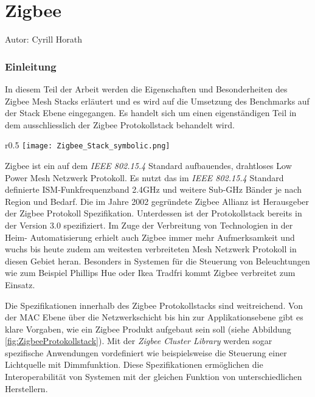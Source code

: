 \vspace*{4cm}
\part{Zigbee}\label{part:Zigbee}
Autor: Cyrill Horath
\vspace*{\fill}
\clearpage

\section{Einleitung}\label{sec:EinleitungZigbee}
In diesem Teil der Arbeit werden die Eigenschaften und Besonderheiten des Zigbee Mesh Stacks erläutert und es wird auf die Umsetzung des Benchmarks auf der Stack Ebene eingegangen. Es handelt sich um einen eigenständigen Teil in dem ausschliesslich der Zigbee Protokollstack behandelt wird.

\begin{wrapfigure}{r}{0.5\textwidth}
	\centering
	\texttt{[image: Zigbee\_Stack\_symbolic.png]}
	\caption{Zigbee Protokollstack}	\label{fig:ZigbeeProtokollstack}
\end{wrapfigure}

Zigbee ist ein auf dem \textit{IEEE 802.15.4} Standard aufbauendes, drahtloses Low Power Mesh Netzwerk Protokoll.
Es nutzt das im \textit{IEEE 802.15.4} Standard definierte ISM-Funkfrequenzband 2.4GHz und weitere Sub-GHz Bänder je nach Region und Bedarf.
Die im Jahre 2002 gegründete Zigbee Allianz ist Herausgeber der Zigbee Protokoll Spezifikation.
Unterdessen ist der Protokollstack bereits in der Version 3.0 spezifiziert.
Im Zuge der Verbreitung von Technologien in der Heim- Automatisierung erhielt auch Zigbee immer mehr Aufmerksamkeit und wuchs bis heute zudem am weitesten verbreiteten Mesh Netzwerk Protokoll in diesen Gebiet heran.
Besonders in Systemen für die Steuerung von Beleuchtungen wie zum Beispiel Phillips Hue oder Ikea Tradfri kommt Zigbee verbreitet zum Einsatz.

Die Spezifikationen innerhalb des Zigbee Protokollstacks sind weitreichend. Von der MAC Ebene über die Netzwerkschicht bis hin zur Applikationsebene gibt es klare Vorgaben, wie ein Zigbee Produkt aufgebaut sein soll (siehe Abbildung \ref{fig:ZigbeeProtokollstack}).
Mit der \textit{Zigbee Cluster Library} werden sogar spezifische Anwendungen vordefiniert wie beispielsweise die Steuerung einer Lichtquelle mit Dimmfunktion.
Diese Spezifikationen ermöglichen die Interoperabilität von Systemen mit der gleichen Funktion von unterschiedlichen Herstellern.